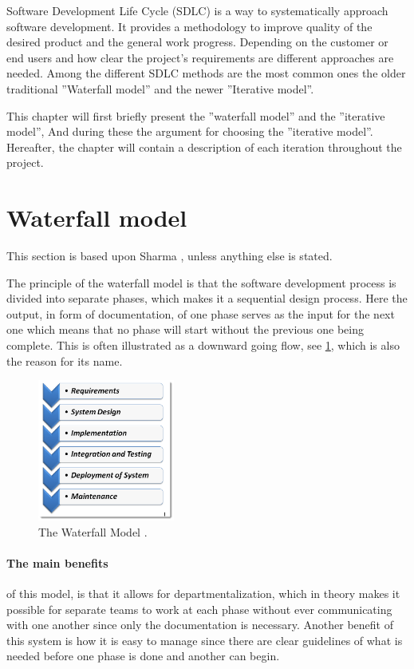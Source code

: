 Software Development Life Cycle (SDLC) is a way to systematically approach software development.
It provides a methodology to improve quality of the desired product and the general work progress. 
Depending on the customer or end users and how clear the project's requirements are different approaches are needed. 
Among the different SDLC methods are the most common ones the older traditional ''Waterfall model'' and the newer ''Iterative model''. \cite{SDLC-Toolsqa}


This chapter will first briefly present the ''waterfall model'' and the ''iterative model'', And during these the argument for choosing the ''iterative model''.
Hereafter, the chapter will contain a description of each iteration throughout the project.


\section{Waterfall model}
This section is based upon Sharma \cite{Waterfall-Toolsqa}, unless anything else is stated.

The principle of the waterfall model is that the software development process is divided into separate phases, which makes it a sequential design process.
Here the output, in form of documentation, of one phase serves as the input for the next one which means that no phase will start without the previous one being complete.
This is often illustrated as a downward going flow, see \cref{fig:Waterfall}, which is also the reason for its name.

\begin{figure}[H]
	\centering
	\includegraphics[width=0.4\textwidth]{billeder/WaterFall-Model.png}
	\caption{The Waterfall Model \cite{Waterfall-Toolsqa}.}\label{fig:Waterfall}
\end{figure}

\paragraph{The main benefits} of this model, is that it allows for departmentalization, which in theory makes it possible for separate teams to work at each phase without ever communicating with one another since only the documentation is necessary.
Another benefit of this system is how it is easy to manage since there are clear guidelines of what is needed before one phase is done and another can begin.

